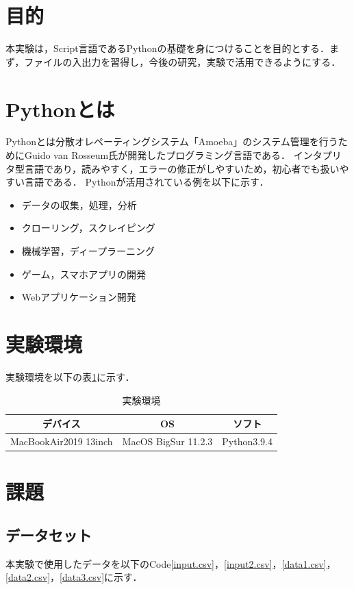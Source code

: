 \documentclass[a4paper,11pt]{jsarticle}
\begin{document}
\section{目的}
本実験は，Script言語であるPythonの基礎を身につけることを目的とする．まず，ファイルの入出力を習得し，今後の研究，実験で活用できるようにする．

\section{Pythonとは}
Python\cite{python}とは分散オレペーティングシステム「Amoeba」のシステム管理を行うためにGuido van Rosseum氏が開発したプログラミング言語である．
インタプリタ型言語であり，読みやすく，エラーの修正がしやすいため，初心者でも扱いやすい言語である．
Pythonが活用されている例を以下に示す．
\begin{itemize}
  \item データの収集，処理，分析
  \item クローリング，スクレイピング
  \item 機械学習，ディープラーニング
  \item ゲーム，スマホアプリの開発
  \item Webアプリケーション開発
\end{itemize}


\section{実験環境}
実験環境を以下の表\ref{em}に示す．
\begin{table}[H]
  \begin{center}
    \caption{実験環境}
    \begin{tabular}{|c|c|c|}  \hline 
      デバイス &  OS & ソフト \\ \hline 
      MacBookAir2019 13inch &  MacOS BigSur 11.2.3 & Python3.9.4 \\ \hline
    \end{tabular}
    \label{em}
  \end{center}
\end{table}

\section{課題}
\subsection{データセット}
  本実験で使用したデータを以下のCode\ref{input.csv}，\ref{input2.csv}，\ref{data1.csv}，\ref{data2.csv}，\ref{data3.csv}に示す．
  
  
  
  
  
\end{document}
